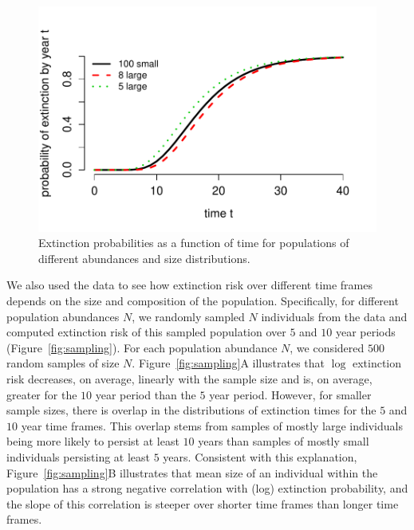 \documentclass[12pt]{amsart}\usepackage[]{graphicx}\usepackage[]{color}
\makeatletter
\def\maxwidth{ %
  \ifdim\Gin@nat@width>\linewidth
    \linewidth
  \else
    \Gin@nat@width
  \fi
}
\newenvironment{knitrout}{}{} %
\makeatother
\begin{document}
\begin{knitrout}
\color{fgcolor}\begin{figure}
\includegraphics[width=\maxwidth]{figure/compare-1} \caption[Extinction probabilities as a function of time for populations of different abundances and size distributions]{Extinction probabilities as a function of time for populations of different abundances and size distributions.}\label{fig:compare}
\end{figure}


\end{knitrout}

We also used the data to see how extinction risk over different time frames depends on the size and composition of the population. Specifically, for different population abundances $N$, we randomly sampled $N$ individuals from the data and computed extinction risk of this sampled population over $5$ and $10$ year periods (Figure~\ref{fig:sampling}). For each population abundance $N$, we considered $500$ random samples of size $N$. Figure~\ref{fig:sampling}A illustrates that $\log$ extinction risk decreases, on average, linearly with the sample size and is, on average, greater for the $10$ year period than the $5$ year period. However, for smaller sample sizes, there is overlap in the distributions of extinction times for the $5$ and $10$ year time frames. This overlap stems from  samples of mostly large individuals being more likely to persist at least $10$ years than samples of mostly small individuals persisting at least $5$ years. Consistent with this explanation, Figure~\ref{fig:sampling}B illustrates that mean size of an individual within the population has a strong negative correlation with (log) extinction probability, and the slope of this correlation is steeper over shorter time frames than longer time frames.
\end{document}
